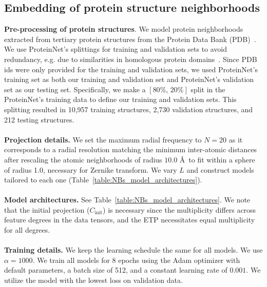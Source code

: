 \subsection{Embedding of protein structure neighborhoods}
\label{sec:protein_neighborhoods_details}
\noindent \textbf{Pre-processing of protein structures}.
We model protein neighborhoods extracted from tertiary protein structures from the Protein Data
Bank (PDB)~\cite{berman_protein_2000}. 
We use ProteinNet’s splittings for training and validation sets to avoid redundancy, e.g. due to
similarities in homologous protein domains~\cite{alquraishi_proteinnet_2019}. Since PDB ids were
only provided for the training and validation sets, we used ProteinNet’s training set as both our
training and validation set and ProteinNet’s validation set as our testing set. Specifically, we
make a $[80\%, \, 20\%]$ split in the ProteinNet's training data to define our training and
validation sets. This splitting resulted in 10,957 training structures, 2,730 validation
structures, and 212 testing structures. \\ %
\\
\textbf{Projection details.} 
We set the maximum radial frequency to $N = 20$ as it corresponds to a radial resolution matching
the minimum inter-atomic distances after rescaling the atomic neighborhoods of radius  $10.0$ \AA\,
to fit within a sphere of radius 1.0, necessary for Zernike transform. We vary $L$ and construct
models tailored to each one (Table~\ref{table:NBs_model_architectures}). \\
\\
\textbf{Model architectures.} See Table~\ref{table:NBs_model_architectures}. We note that the
initial projection ($C_{\text{init}}$) is necessary since the multiplicity differs across feature
degrees in the data tensors, and the ETP necessitates equal multiplicity for all degrees.\\
\\
\textbf{Training details.} We keep the learning schedule the same for all models. We use $\alpha =
1000$. We train all models for $8$ epochs using the Adam optimizer with default parameters, a batch
size of 512, and a constant learning rate of $0.001$. We utilize the model with the lowest loss on
validation data.\\

